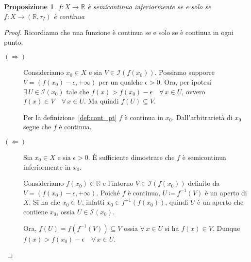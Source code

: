 \documentclass[a4paper, 11pt]{article}
\newcommand{\R}{\mathbb{R}}
\newcommand{\I}[1]{\mathcal{I}(#1)}
\theoremstyle{plain} 	%
\newtheorem{proposizione}{Proposizione}
\theoremstyle{definition}
\theoremstyle{remark}
\begin{document}
    \begin{proposizione}\label{prop:con_top}
        $f\colon X\to\R$ è semicontinua inferiormente se e solo se $f\colon X\to\left(\R,\tau_I\right)$ è continua
    \end{proposizione}
    \begin{proof} Ricordiamo che una funzione è continua se e solo se è continua in ogni punto.
        \begin{description}
            \item[$\left(\Longrightarrow\right)$] Consideriamo $x_0\in X$ e sia $V\in\I{f(x_0)}$. Possiamo supporre $V=(f(x_0)-\epsilon,+\infty)$ per un qualche $\epsilon>0$. Ora, per ipotesi $\exists\,U\in\I{x_0}$ tale che $f(x)>f(x_0)-\epsilon\quad\forall\,x\in U$, ovvero $f(x)\in V\quad\forall\,x\in U$. Ma quindi $f\left(U\right)\subseteq V$. 

            Per la definizione~\ref{def:cont_pt} $f$ è continua in $x_0$. Dall'arbitrarietà di $x_0$ segue che $f$ è continua.
            \item[$\left(\Longleftarrow\right)$] Sia $x_0\in X$ e sia $\epsilon>0$. \`E sufficiente dimostrare che $f$ è semicontinua inferiormente in $x_0$.
            
            Consideriamo $f(x_0)\in\R$ e l'intorno $V\in\I{f(x_0)}$ definito da $V=(f(x_0)-\epsilon,+\infty)$. Poiché $f$ è continua, $U\coloneqq f^{-1}\left(V\right)$ è un aperto di $X$. Si ha che $x_0\in U$, infatti $x_0\in f^{-1}(f(x_0))$, quindi $U$ è un aperto che contiene $x_0$, ossia $U\in\I{x_0}$. 

            Ora, $f\left(U\right)=f\left(f^{-1}(V)\right)\subseteq V$ ossia $\forall\,x\in U$ si ha $f(x)\in V$. Dunque $f(x)>f(x_0)-\epsilon\quad\forall\,x\in U$. \qedhere
        \end{description}
    \end{proof}
\end{document}
